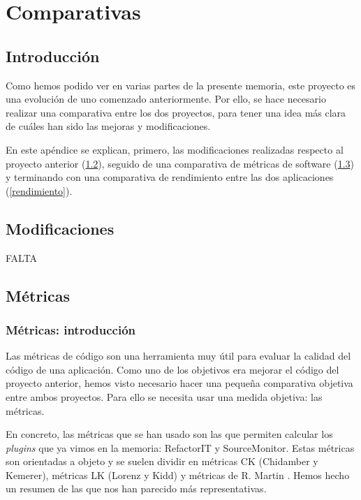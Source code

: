 \chapter{Comparativas}

\section{Introducción}
Como hemos podido ver en varias partes de la presente memoria, este proyecto es una evolución de uno comenzado anteriormente. Por ello, se hace necesario realizar una comparativa entre los dos proyectos, para tener una idea más clara de cuáles han sido las mejoras y modificaciones.

En este apéndice se explican, primero, las modificaciones realizadas respecto al proyecto anterior (\ref{modificaciones}), seguido de una comparativa de métricas de software (\ref{metricas}) y terminando con una comparativa de rendimiento entre las dos aplicaciones (\ref{rendimiento}).

\section{Modificaciones}\label{modificaciones}
FALTA


\section{Métricas}\label{metricas}
\subsection{Métricas: introducción}
Las métricas de código son una herramienta muy útil para evaluar la calidad del código de una aplicación. Como uno de los objetivos era mejorar el código del proyecto anterior, hemos visto necesario hacer una pequeña comparativa objetiva entre ambos proyectos. Para ello se necesita usar una medida objetiva: las métricas.

En concreto, las métricas que se han usado son las que permiten calcular los \textit{plugins} que ya vimos en la memoria: RefactorIT y SourceMonitor. Estas métricas son orientadas a objeto y se suelen dividir en métricas CK (Chidamber y Kemerer), métricas LK (Lorenz y Kidd) y métricas de R. Martin \cite{carlos_lopez_nozal_apuntes_2012}. Hemos hecho un resumen de las que nos han parecido más representativas.

